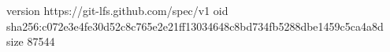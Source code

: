 version https://git-lfs.github.com/spec/v1
oid sha256:c072e3e4fe30d52c8c765e2e21ff13034648c8bd734fb5288dbe1459c5ca4a8d
size 87544
